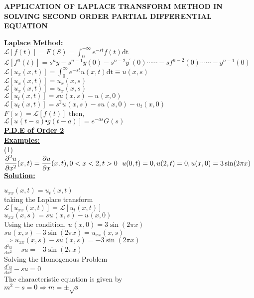 \documentclass[a4paper 11pt]{article}
\newcommand{\Laplace}{\mathcal{L}}
\newcommand{\ft}{f(t)}
\newcommand{\ftn}[1]{f^{#1}(t)}
\newcommand{\FS}{F(S)}
\newcommand{\LaplaceIntegral}{\int_{0}^{-\infty}e^{-st}\ft\text{dt}}
\newcommand{\sbracket}[1]{\left[#1\right]}
\newcommand{\Yn}[1]{y^{#1}(0)}
\newcommand{\fn}[1]{f^{#1}(0)}
\newcommand{\Sn}[1]{s^{#1}}
\newcommand{\LUx}[1]{\Laplace\sbracket{u_{#1}(x,t)}}
\newcommand{\Un}[2]{u_{#1}(#2)}
\newcommand{\LInt}{\int_{0}^{\infty}e^{-st}u(x,t)\text{dt}}
\newcommand{\LFt}{\Laplace \sbracket{\ftn{}}}
\newcommand{\NI}{\noindent}
\newcommand{\LFn}[1]{\Laplace \sbracket{#1}}
\begin{document}
\begin{center}
\textbf{APPLICATION OF LAPLACE TRANSFORM METHOD IN SOLVING SECOND ORDER PARTIAL DIFFERENTIAL EQUATION} \\[1.5cm]
\end{center}

\NI \underline{\textbf{Laplace Method:}}\\[0.2cm]

\NI $\Laplace\left[\ft\right] = \FS = \LaplaceIntegral$ \\[0.1cm]
$ \Laplace \sbracket{\ftn{n}}  = s^{n}y - \Sn{n-1}y(0) - \Sn{n-2}\Yn{\prime} \cdots\cdots - s\fn{n-2} \cdots\cdots - y^{n-1}(0) $ \\[0.1cm]
$\LUx{x} = \LInt \equiv u(x,s) $\\[0.1cm]
$\LUx{x} = \Un{x}{x,s}$\\[0.1cm]
$\LUx{x} = \Un{x}{x,s}$\\[0.1cm]
$\LUx{t} = s\Un{}{x,s} - \Un{}{x,0}$\\[0.1cm]
$\LUx{t} = s^{2}\Un{}{x,s} - s\Un{}{x,0} - \Un{t}{x,0}$\\[0.1cm]
$F(s) = \LFt $ then,\\[0.2cm]
$\Laplace\sbracket{\Un{}{t-a}\centerdot g(t-a)} = e^{-as}G(s)$\\[.6cm]

\NI \underline{\textbf{P.D.E of Order 2}}\\[0.1cm]

\NI \underline{\textbf{Examples:}}\\[0.2cm]

\NI (1) ${\displaystyle \frac{\partial^{2}u}{\partial x^{2}}(x,t) = \frac{\partial u}{\partial x}(x,t), 0 < x < 2, t > 0  \text{ \text{ }} u(0,t) = 0, u(2,t) = 0, u(x,0) = 3\sin(2\pi x)}$\\

\NI \underline{\textbf{Solution:}}

\NI $\Un{xx}{x,t} = \Un{t}{x,t}$\\[0.2cm]
taking the Laplace transform \\[0.2cm]
$\LFn{\Un{xx}{x,t}} = \LFn{\Un{t}{x,t}}$\\[0.2cm]
$\Un{xx}{x,s} = s\Un{}{x,s} - \Un{}{x,0}$\\[0.7cm]
Using the condition, $\Un{}{x,0} = 3\sin(2\pi x)$ \\[0.2cm]
$s\Un{}{x,s} - 3\sin(2\pi x) = \Un{xx}{x,s}$ \\[0.2cm]
$\Longrightarrow \Un{xx}{x,s} - s\Un{}{x,s} = - 3\sin(2\pi x)$ \\[0.2cm]
${\displaystyle \frac{d^{2}u}{dx^{2}} - su = - 3\sin(2\pi x)}$\\[0.7cm]
Solving the Homogenous Problem \\[0.2cm]
${\displaystyle \frac{d^{2}u}{dx^{2}} - su = 0}$\\[0.7cm]
The characteristic equation is given by \\[0.2cm]
$m^2 - s = 0 \Rightarrow m = \pm \sqrt{s}$ \\[0.2cm]
\end{document}
